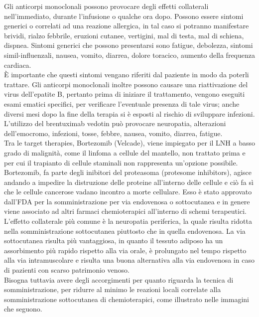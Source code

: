 Gli anticorpi monoclonali possono provocare degli effetti collaterali nell’immediato, durante l’infusione o 
qualche ora dopo. 
Possono essere sintomi generici o correlati ad una reazione allergica, in tal caso si potranno manifestare brividi, 
rialzo febbrile, eruzioni cutanee, vertigini, mal di testa, mal di schiena, dispnea. 
Sintomi generici che possono presentarsi sono fatigue, debolezza, sintomi simil-influenzali, nausea, vomito, 
diarrea, dolore toracico, aumento della frequenza cardiaca\cite{LLSIMMUNO}.\\
È importante che questi sintomi vengano riferiti dal paziente in modo da poterli trattare.		
Gli anticorpi monoclonali inoltre possono causare una riattivazione del virus dell’epatite B, pertanto prima di iniziare 
il trattamento, vengono eseguiti esami ematici specifici, 
per verificare l’eventuale presenza di tale virus; anche diversi mesi dopo la fine della terapia
si è esposti al rischio di sviluppare infezioni. 
L’utilizzo del brentuximab vedotin può provocare neuropatia, alterazioni  dell’emocromo, infezioni, tosse, febbre, 
nausea, vomito, diarrea, fatigue\cite{IMMUNOTP}.\\

Tra le target therapies, Bortezomib (Velcade), viene impiegato per il LNH a basso grado di malignità, 
come il linfoma a cellule del mantello, non trattato prima e per cui il trapianto di cellule staminali 
non rappresenta un'opzione possibile.\\
Bortezomib, fa parte degli inibitori del proteasoma (protesome inhibitors), agisce andando a impedire la distruzione 
delle proteine all’interno delle cellule e ciò fa sì che le cellule cancerose vadano incontro a 
morte cellulare\cite{LOWGRADE}.
Esso è stato approvato dall’FDA per la somministrazione per via endovenosa o sottocutanea e in genere viene associato 
ad altri farmaci chemioterapici all’interno di schemi terapeutici.\\ 
L’effetto collaterale più comune è la neuropatia periferica, 
la quale risulta ridotta nella somministrazione sottocutanea piuttosto che in quella endovenosa. 
La via sottocutanea risulta più vantaggiosa, in quanto il tessuto adiposo ha un assorbimento più rapido rispetto 
alla via orale, è prolungato nel tempo rispetto alla via intramuscolare e 
risulta una buona alternativa alla via endovenosa in caso di pazienti con scarso patrimonio venoso\cite{BORTEZOMIB}.\\
Bisogna tuttavia avere degli accorgimenti per quanto riguarda la tecnica di somministrazione, per ridurre al minimo 
le reazioni locali correlate alla somministrazione sottocutanea di chemioterapici, 
come illustrato nelle immagini che seguono.

